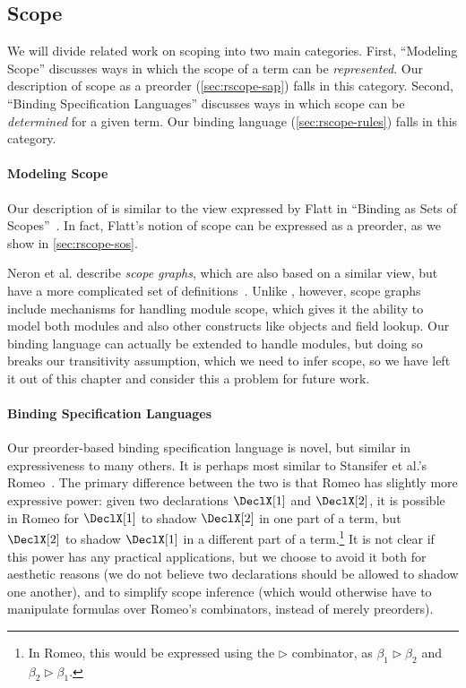 \subsection{Scope}

We will divide related work on scoping into two main categories.
First, ``Modeling Scope'' discusses ways in which the scope of a term
can be \emph{represented}. Our description of scope as a
preorder (\cref{sec:rscope-sap}) falls in this category.
Second, ``Binding Specification Languages'' discusses ways in which scope
can be \emph{determined} for a given term. Our binding
language (\cref{sec:rscope-rules}) falls in this category.

\paragraph{Modeling Scope}

Our description of {\sap} is similar to the view
expressed by Flatt in ``Binding as Sets of Scopes''~\cite{flatt:scope}.
In fact, Flatt's notion of scope can be expressed as a preorder,
as we show in \cref{sec:rscope-sos}.

Neron et al. describe \emph{scope graphs}, which are also based on a
similar view, but have a more complicated set of definitions~\cite{neron-scope}.
Unlike {\sap}, however, scope graphs include mechanisms for handling
module scope, which gives it the ability to model both modules and
also other constructs like objects and field lookup.
Our {\sap} binding language can actually be extended to
handle modules, but doing so breaks our transitivity
assumption, which we need to infer scope, so we have left it out of
this chapter and consider this a problem for
future work.

\paragraph{Binding Specification Languages}

Our preorder-based binding specification language is novel, but
similar in expressiveness to many others.  It is perhaps most similar
to Stansifer et al.'s Romeo~\cite{stansifer-romeo}.
The primary difference between the two is that
Romeo has slightly more expressive power: given two declarations
$\DeclX[1]$ and $\DeclX[2]$, it is possible in Romeo for $\DeclX[1]$
to shadow $\DeclX[2]$ in one part of a term, but $\DeclX[2]$ to shadow
$\DeclX[1]$ in a different part of a term.\footnote{
  In Romeo, this would be expressed using the $\rhd$ combinator,
  as $\beta_1 \rhd \beta_2$ and $\beta_2 \rhd \beta_1$.
} It is not clear
if this power has any practical applications, but we choose to avoid
it both for aesthetic reasons (we do not believe two declarations
should be allowed to shadow one another), and to simplify scope
inference (which would otherwise have to manipulate formulas over
Romeo's combinators, instead of merely preorders).

